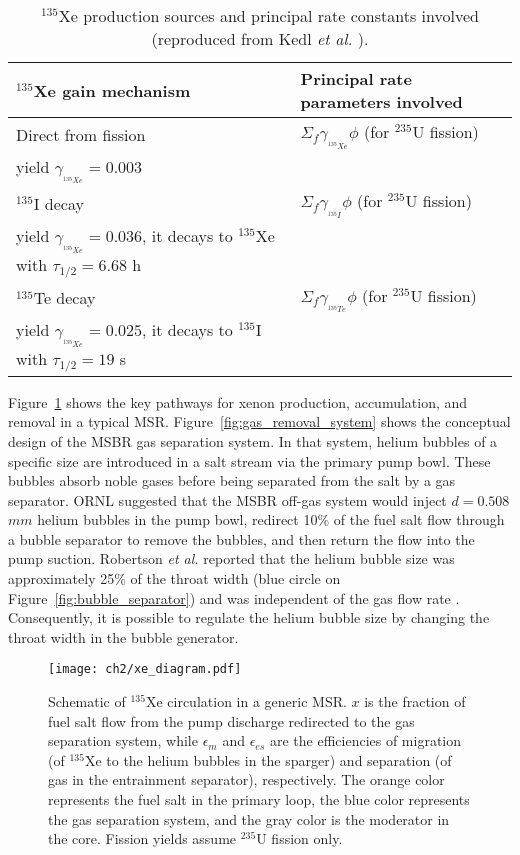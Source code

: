 \begin{table}[ht!]
	\caption{$^{135}$Xe production sources and principal rate constants 
		involved (reproduced from Kedl \emph{et al.} 
		\cite{kedl_development_1967}).}
	\centering
	\begin{tabularx}{\textwidth}{b  b}
		\hline \textbf{$^{135}$Xe gain mechanism} & \textbf{Principal rate 
			parameters involved}  	\\ [5pt] \hline 
		Direct from fission & $\Sigma_f \gamma_{_{^{135}Xe}}\phi$ (for 
		$^{235}$U fission) \\
		yield $\gamma_{_{^{135}Xe}}\!\!\!=0.003$ & \\ [5pt] \hline 
		$^{135}$I decay     & $\Sigma_f \gamma_{_{^{135}I}}\phi$ (for 
		$^{235}$U fission) \\
		yield $\gamma_{_{^{135}Xe}}\!\!\!=0.036$, it decays to $^{135}$Xe with 
		$\tau_{1/2}=6.68$ h & 			                    \\	[5pt]	\hline 
		$^{135}$Te decay    & $\Sigma_f \gamma_{_{^{135}Te}}\phi$ (for 
		$^{235}$U 		fission) \\
		yield $\gamma_{_{^{135}Xe}}\!\!\!=0.025$, 
		it decays to $^{135}$I with $\tau_{1/2}=19$ s 
		& 			                    \\ [5pt]	\hline
	\end{tabularx}
	\label{tab:xe_gain}
\end{table}
Figure~\ref{fig:xe_diagram} shows the key pathways for xenon production, 
accumulation, and removal in a typical \gls{MSR}.  
Figure~\ref{fig:gas_removal_system} shows the conceptual design of the  
\gls{MSBR} gas separation system. In that system, helium bubbles of a specific 
size are introduced in a salt stream via the primary pump bowl. These bubbles 
absorb noble gases before being separated from the salt by a gas separator. 
\gls{ORNL} suggested that the \gls{MSBR} off-gas system would inject 
$d=0.508$ $mm$ helium bubbles in the pump bowl, redirect 10\% of the fuel salt 
flow through a bubble separator to remove the bubbles, and then return the 
flow into the pump suction. Robertson \emph{et al.} reported that the helium 
bubble size was approximately 25\% of the throat width (blue circle on 
Figure~\ref{fig:bubble_separator}) and was independent of the gas flow rate 
\cite{robertson_conceptual_1971}. Consequently, it is possible to regulate the 
helium bubble size by changing the throat width in the bubble generator.
\begin{figure}[htp!] %
	\centering
	\texttt{[image: ch2/xe\_diagram.pdf]}
	\caption{Schematic of $^{135}$Xe circulation in a generic \gls{MSR}. $x$ 
	is the fraction of fuel salt flow from the pump discharge redirected to 
	the gas separation system, while $\epsilon_m$ and $\epsilon_{es}$ are the 
	efficiencies of migration (of $^{135}$Xe to the helium bubbles in the 
	sparger) and separation (of gas in the entrainment separator), 
	respectively. The orange color represents the fuel salt in the primary 
	loop, the blue color represents the gas separation system, and the gray 
	color is the moderator in the core. Fission yields assume $^{235}$U 
	fission 	only.}
	\label{fig:xe_diagram}
\end{figure}
